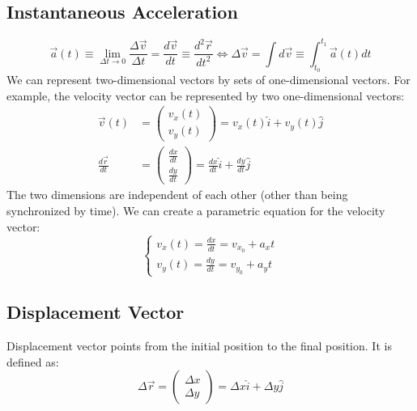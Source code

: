 \documentclass[article, 11pt]{article}
\theoremstyle{definition}
\begin{document}
    \subsection{Instantaneous Acceleration}
    \begin{equation}
        \vec{a}(t) \equiv \lim_{\Delta t \to 0} \frac{\Delta \vec{v}}{\Delta t} = \frac{d\vec{v}}{dt} \equiv \frac{d^2\vec{r}}{dt^2}  \iff \Delta \vec{v} = \int d\vec{v} \equiv \int_{t_0}^{t_1} \vec{a}(t) dt
        \label{eq:instantaneous acceleration 2d}
    \end{equation}
    We can represent two-dimensional vectors by sets of one-dimensional vectors. For example, the velocity vector can be represented by two one-dimensional vectors:
    \begin{align}
        \vec{v}(t) &= \begin{pmatrix} v_x(t) \\ v_y(t) \end{pmatrix} = v_x(t)\hat{i} + v_y(t)\hat{j} \nonumber \\
        \frac{d\vec{r}}{dt} &= \begin{pmatrix} \displaystyle\frac{dx}{dt} \\[.75em] \displaystyle\frac{dy}{dt} \end{pmatrix} = \frac{dx}{dt}\hat{i} + \frac{dy}{dt}\hat{j}
        \label{eq:velocity vector components}
    \end{align}
    The two dimensions are independent of each other (other than being synchronized by time). We can create a parametric equation for the velocity vector:
    \begin{equation}
        \begin{cases}
            v_x(t) = \displaystyle\frac{dx}{dt} = v_{x_0} + a_xt \\[.75em]
            v_y(t) = \displaystyle\frac{dy}{dt} = v_{y_0} + a_yt
        \end{cases}
        \label{eq:velocity vector parametric}
    \end{equation}
    \subsection{Displacement Vector}
    Displacement vector points from the initial position to the final position. It is defined as:
    \begin{equation}
        \Delta \vec{r} = \begin{pmatrix} \Delta x \\ \Delta y \end{pmatrix} = \Delta x\hat{i} + \Delta y\hat{j}
        \label{eq:displacement vector}
    \end{equation}
\end{document}
